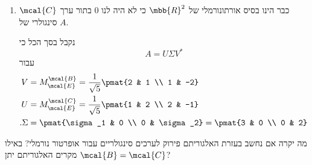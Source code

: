 \documentclass[a4paper,10pt,twoside,openany]{book}
\begin{document}
\begin{solution}
\begin{enumerate}
נקבל בסיס
$\prs{\pmat{2 \\ 1}, \pmat{1 \\ -2}}$
של וקטורים עצמיים של
$A^* A$.
ננרמל את הוקטורים כדי לקבל בסיס אורתונורמלי של וקטורים עצמיים של
$A^* A$,
\begin{align*}
\text{.} \mcal{B} = \prs{\frac{1}{\sqrt{5}} \pmat{2 \\ 1}, \frac{1}{\sqrt{5}} \pmat{1 \\ -2}}
\end{align*}
וניקח גם
\begin{align*}
\mcal{C} &= \prs{\frac{1}{\sigma_1} A \prs{\frac{1}{\sqrt{5}} \pmat{2 \\ 1}}, \frac{1}{\sigma_2} A \prs{\frac{1}{\sqrt{5}}\pmat{1 \\ -2}}}
\\&= \prs{\frac{1}{3 \sqrt{5}} \pmat{3 \\ 6}, \frac{1}{2 \sqrt{5}} \pmat{4 \\ -2}}
\\&= \pmat{\frac{1}{\sqrt{5}} \pmat{1 \\ 2}, \frac{1}{\sqrt{5}} \pmat{2 \\ - 1}}
\end{align*}
שהינו בסיס אורתונורמלי של
$\mbb{R}^2$.

\item
$\mcal{C}$
כבר הינו בסיס אורתונורמלי של
$\mbb{R}^2$
כי לא היה לנו
$0$
בתור ערך סינגולרי של
$A$.

נקבל בסך הכל כי
\[A = U \Sigma V^*\]
עבור
\begin{align*}
V &= M^\mcal{B}_\mcal{E} = \frac{1}{\sqrt{5}} \pmat{2 & 1 \\ 1 & -2} \\
U &= M^\mcal{C}_\mcal{E} = \frac{1}{\sqrt{5}} \pmat{1 & 2 \\ 2 & -1} \\
\text{.} \Sigma &= \pmat{\sigma_1 & 0 \\ 0 & \sigma_2} = \pmat{3 & 0 \\ 0 & 2}
\end{align*}
\end{enumerate}
\end{solution}

\begin{exercisechap}
מה יקרה אם נחשב בעזרת האלגוריתם פירוק לערכים סינגולריים עבור אופרטור נורמלי?
באילו מקרים האלגוריתם יתן
$\mcal{B} = \mcal{C}$?
\end{exercisechap}
\end{document}
